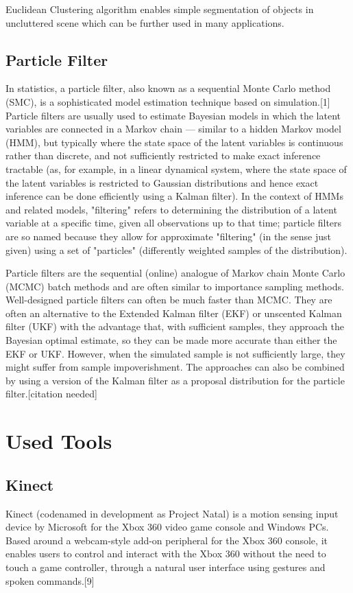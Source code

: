 Euclidean Clustering algorithm enables simple segmentation of objects in uncluttered scene which can be further used in many applications.   

\subsection{Particle Filter}
In statistics, a particle filter, also known as a sequential Monte Carlo method (SMC), is a sophisticated model estimation technique based on simulation.[1] Particle filters are usually used to estimate Bayesian models in which the latent variables are connected in a Markov chain — similar to a hidden Markov model (HMM), but typically where the state space of the latent variables is continuous rather than discrete, and not sufficiently restricted to make exact inference tractable (as, for example, in a linear dynamical system, where the state space of the latent variables is restricted to Gaussian distributions and hence exact inference can be done efficiently using a Kalman filter). In the context of HMMs and related models, "filtering" refers to determining the distribution of a latent variable at a specific time, given all observations up to that time; particle filters are so named because they allow for approximate "filtering" (in the sense just given) using a set of "particles" (differently weighted samples of the distribution).

Particle filters are the sequential (online) analogue of Markov chain Monte Carlo (MCMC) batch methods and are often similar to importance sampling methods. Well-designed particle filters can often be much faster than MCMC. They are often an alternative to the Extended Kalman filter (EKF) or unscented Kalman filter (UKF) with the advantage that, with sufficient samples, they approach the Bayesian optimal estimate, so they can be made more accurate than either the EKF or UKF. However, when the simulated sample is not sufficiently large, they might suffer from sample impoverishment. The approaches can also be combined by using a version of the Kalman filter as a proposal distribution for the particle filter.[citation needed]


\section{Used Tools}
\subsection{Kinect}
Kinect (codenamed in development as Project Natal) is a motion sensing input device by Microsoft for the Xbox 360 video game console and Windows PCs. Based around a webcam-style add-on peripheral for the Xbox 360 console, it enables users to control and interact with the Xbox 360 without the need to touch a game controller, through a natural user interface using gestures and spoken commands.[9]

